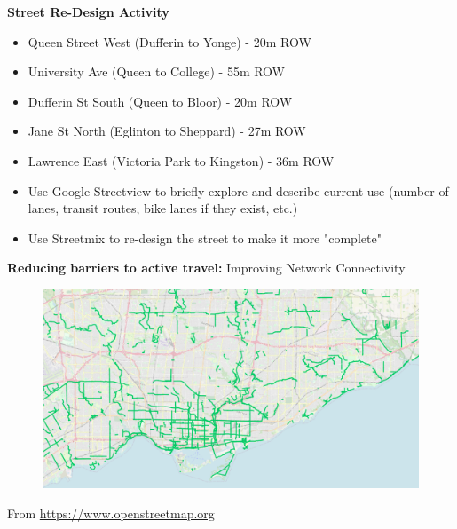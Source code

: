 \documentclass[aspectratio=169]{beamer}
\begin{document}
\begin{frame}
	
	\textbf{Street Re-Design Activity}


	\vspace{4mm}
	
	\begin{itemize}
		\item Queen Street West (Dufferin to Yonge) - 20m ROW
		\item University Ave (Queen to College) - 55m ROW
		\item Dufferin St South (Queen to Bloor) - 20m ROW
		\item Jane St North (Eglinton to Sheppard) - 27m ROW
		\item Lawrence East (Victoria Park to Kingston) - 36m ROW
	\end{itemize}

	
	\vspace{4mm}
	
	
	\begin{itemize}
		\item Use Google Streetview to briefly explore and describe current use (number of lanes, transit routes, bike lanes if they exist, etc.)
		\item Use Streetmix to re-design the street to make it more "complete"
	\end{itemize}
	
\end{frame}



\begin{frame}
	
	\textbf{Reducing barriers to active travel:} Improving Network Connectivity
	
	\begin{figure}
		\centering
		\includegraphics[width=1\linewidth]{images/bike_network_tor.png}
	\end{figure}
	
	\tiny From \url{https://www.openstreetmap.org}
	
\end{frame}
\end{document}
